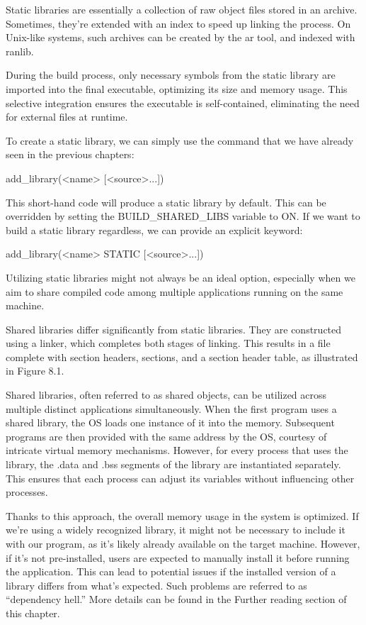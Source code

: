 Static libraries are essentially a collection of raw object files stored in an archive. Sometimes, they’re extended with an index to speed up linking the process. On Unix-like systems, such archives can be created by the ar tool, and indexed with ranlib.

During the build process, only necessary symbols from the static library are imported into the final executable, optimizing its size and memory usage. This selective integration ensures the executable is self-contained, eliminating the need for external files at runtime.

To create a static library, we can simply use the command that we have already seen in the previous chapters:

\begin{shell}
add_library(<name> [<source>...])
\end{shell}

This short-hand code will produce a static library by default. This can be overridden by setting the BUILD\_SHARED\_LIBS variable to ON. If we want to build a static library regardless, we can provide an explicit keyword:

\begin{shell}
add_library(<name> STATIC [<source>...])
\end{shell}

Utilizing static libraries might not always be an ideal option, especially when we aim to share compiled code among multiple applications running on the same machine.


Shared libraries differ significantly from static libraries. They are constructed using a linker, which completes both stages of linking. This results in a file complete with section headers, sections, and a section header table, as illustrated in Figure 8.1.

Shared libraries, often referred to as shared objects, can be utilized across multiple distinct applications simultaneously. When the first program uses a shared library, the OS loads one instance of it into the memory. Subsequent programs are then provided with the same address by the OS, courtesy of intricate virtual memory mechanisms. However, for every process that uses the library, the .data and .bss segments of the library are instantiated separately. This ensures that each process can adjust its variables without influencing other processes.

Thanks to this approach, the overall memory usage in the system is optimized. If we’re using a widely recognized library, it might not be necessary to include it with our program, as it’s likely already available on the target machine. However, if it’s not pre-installed, users are expected to manually install it before running the application. This can lead to potential issues if the installed version of a library differs from what’s expected. Such problems are referred to as “dependency hell.” More details can be found in the Further reading section of this chapter.

